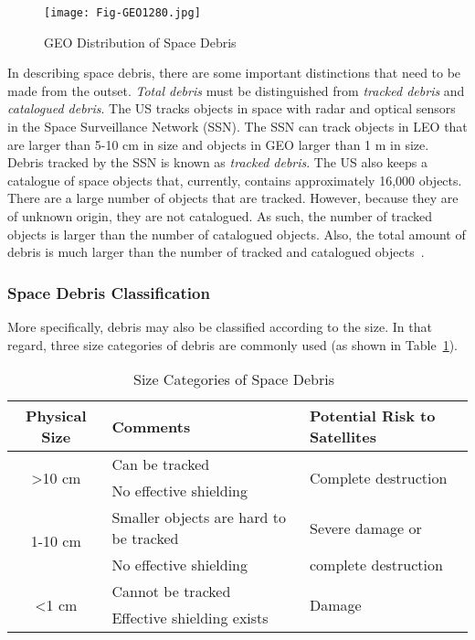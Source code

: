 \documentclass{mcmthesis}
\begin{document}
	\begin{figure}[htbp]
		\centering
		\texttt{[image: Fig-GEO1280.jpg]}
		\caption{GEO Distribution of Space Debris}
		\label{Fig-GEO}
	\end{figure}
	
	In describing space debris, there are some important distinctions that need to be made from the outset. \emph{Total debris} must be distinguished from \emph{tracked debris} and \emph{catalogued debris}. The US tracks objects in space with radar and optical sensors in the Space Surveillance Network (SSN). The SSN can track objects in LEO that are larger than 5-10 cm in size and objects in GEO larger than 1 m in size. Debris tracked by the SSN is known as \emph{tracked debris}. The US also keeps a catalogue of space objects that, currently, contains approximately 16,000 objects. There are a large number of objects that are tracked. However, because they are of unknown origin, they are not catalogued. As such, the number of tracked objects is larger than the number of catalogued objects. Also, the total amount of debris is much larger than the number of tracked and catalogued objects~\cite{Jakhu}.
	
\subsubsection{Space Debris Classification}\label{Sec-DebrisClassification}
	
	More specifically, debris may also be classified according to the size. In that regard, three size categories of debris are commonly used (as shown in Table~\ref{Tab-DebrisClassification}).
	
	\begin{table}[htbp]
		\centering
		\caption{Size Categories of Space Debris~\cite{Jakhu}}
		\begin{tabular}{cll}
			\hline
			Physical Size &  Comments & Potential Risk to Satellites\\
			\hline
			\hline
			\multirow{2}{*}{>10 cm} & Can be tracked & \multirow{2}{*}{Complete destruction}\\
			& No effective shielding & \\
			\hline
			\multirow{2}{*}{1-10 cm} & Smaller objects are hard to be tracked & Severe damage or \\
			& No effective shielding & complete destruction\\
			\hline
			\multirow{2}{*}{<1 cm} & Cannot be tracked & \multirow{2}{*}{Damage}\\
			& Effective shielding exists & \\
			\hline
		\end{tabular}
		\label{Tab-DebrisClassification}
	\end{table}
	
\end{document}
